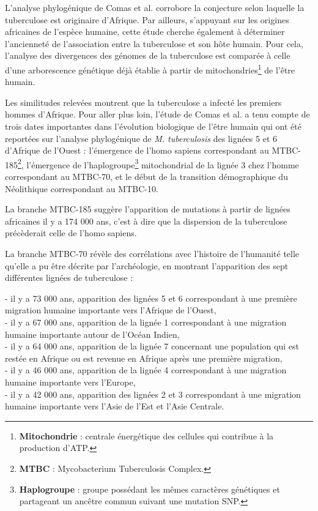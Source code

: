 \documentclass[twoside,a4paper,11pt,frenchb,openany]{report}
\begin{document}
L'analyse phylogénique de Comas et al. corrobore la conjecture selon laquelle la tuberculose est originaire d'Afrique. Par ailleurs, s'appuyant sur les origines africaines de l'espèce humaine, cette étude cherche également à déterminer l'ancienneté de l'association entre la tuberculose et son hôte humain. Pour cela, l'analyse des divergences des génomes de la tuberculose est comparée à celle d'une arborescence génétique déjà établie à partir de mitochondries\footnote{\textbf{Mitochondrie} : centrale énergétique des cellules qui contribue à la production d'ATP.} de l'être humain. 


Les similitudes relevées montrent que la tuberculose a infecté les premiers hommes d'Afrique. Pour aller plus loin, l'étude de Comas et al. a tenu compte de trois dates importantes dans l'évolution biologique de l'être humain qui ont été reportées sur l'analyse phylogénique de \textit{M. tuberculosis} des lignées 5 et 6 d'Afrique de l'Ouest : l'émergence de l'homo sapiens correspondant au MTBC-185\footnote{\textbf{MTBC} : Mycobacterium Tuberculosis Complex.}, l'émergence de l'haplogroupe\footnote{\textbf{Haplogroupe} : groupe possédant les mêmes caractères génétiques et partageant un ancêtre commun suivant une mutation SNP.} mitochondrial de la lignée 3 chez l'homme correspondant au MTBC-70, et le début de la transition démographique du Néolithique correspondant au MTBC-10.

La branche MTBC-185 suggère l'apparition de mutations à partir de lignées africaines il y a 174 000 ans, c'est à dire que la dispersion de la tuberculose précèderait celle de l'homo sapiens.

La branche MTBC-70 révèle des corrélations avec l'histoire de l'humanité telle qu'elle a pu être décrite par l'archéologie, en montrant l'apparition des sept différentes lignées de tuberculose :

- il y a 73 000 ans, apparition des lignées 5 et 6 correspondant à une première migration humaine importante vers l'Afrique de l'Ouest,\\
- il y a 67 000 ans, apparition de la lignée 1 correspondant à une migration humaine importante autour de l'Océan Indien,\\
- il y a 64 000 ans, apparition de la lignée 7 concernant une population qui est restée en Afrique ou est revenue en Afrique après une première migration,\\
- il y a 46 000 ans, apparition de la lignée 4 correspondant à une migration humaine importante vers l'Europe,\\
- il y a 42 000 ans, apparition des lignées 2 et 3 correspondant à une migration humaine importante vers l'Asie de l'Est et l'Asie Centrale. 
\end{document}
